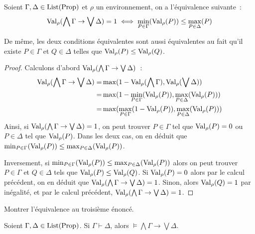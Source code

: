 \begin{lemma}
  Soient $\Gamma,\Delta\in\operatorname{List}(\operatorname{Prop})$ et $\rho$ un environnement, on a
  l'équivalence suivante~:
  \[ \operatorname{Val}_\rho(\bigwedge\Gamma\to\bigvee\Delta) = 1 \iff
  \min_{P\in\Gamma}(\operatorname{Val}_\rho(P)) \leq \max_{P\in\Delta}(P)\]

  De même, les deux conditions équivalentes sont aussi équivalentes au fait
  qu'il existe $P\in\Gamma$ et $Q\in\Delta$ telles que
  $\operatorname{Val}_\rho(P)\leq\operatorname{Val}_\rho(Q)$.
\end{lemma}

\begin{proof}
  Calculons d'abord $\operatorname{Val}_\rho(\bigwedge\Gamma\to\bigvee\Delta)$~:
  \begin{align*}
    \operatorname{Val}_\rho(\bigwedge\Gamma\to\bigvee\Delta) =&
    \max(1 - \operatorname{Val}_\rho(\bigwedge\Gamma), \operatorname{Val}_\rho(\bigvee\Delta))\\
    =& \max(1 - \min_{P\in \Gamma}(\operatorname{Val}_\rho(P)),\max_{P\in\Delta}(\operatorname{Val}_\rho(P)))\\
    =& \max(\max_{P\in\Gamma}(1 - \operatorname{Val}_\rho(P)),\max_{P\in\Delta}(\operatorname{Val}_\rho(P)))
  \end{align*}
  Ainsi, si $\operatorname{Val}_\rho(\bigwedge\Gamma\to\bigvee\Delta) = 1$, on peut trouver
  $P\in\Gamma$ tel que $\operatorname{Val}_\rho(P) = 0$ ou $P\in\Delta$ tel que $\operatorname{Val}_\rho(P)$.
  Dans les deux cas, on en déduit que
  $\min_{P\in\Gamma}(\operatorname{Val}_\rho(P)) \leq \max_{P\in\Delta}(\operatorname{Val}_\rho(P))$.

  Inversement, si
  $\min_{P\in\Gamma}(\operatorname{Val}_\rho(P))\leq\max_{P\in\Delta}(\operatorname{Val}_\rho(P))$
  alors on peut trouver $P\in\Gamma$ et $Q\in\Delta$ tels que
  $\operatorname{Val}_\rho(P)\leq\operatorname{Val}_\rho(Q)$. Si $\operatorname{Val}_\rho(P) = 0$ alors par le calcul
  précédent, on en déduit que $\operatorname{Val}_\rho(\bigwedge\Gamma\to\bigvee\Delta) = 1$.
  Sinon, alors $\operatorname{Val}_\rho(Q) = 1$ par inégalité, et par le calcul précédent,
  $\operatorname{Val}_\rho(\bigwedge\Gamma\to\bigvee\Delta) = 1$.
\end{proof}

\begin{exercise}
  Montrer l'équivalence au troisième énoncé.
\end{exercise}

\begin{theorem}
  Soient $\Gamma,\Delta\in\operatorname{List}(\operatorname{Prop})$. Si $\Gamma\vdash\Delta$, alors
  $\models \bigwedge \Gamma\to \bigvee \Delta$.
\end{theorem}

